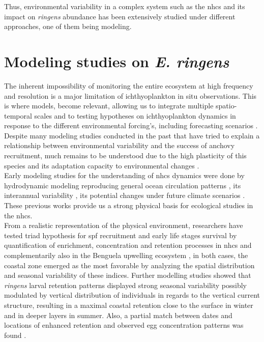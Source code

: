 Thus, environmental variability in a complex system such as the \acrshort{nhcs} and its impact on \textit{\gls{ringens}} abundance has been extensively studied under different approaches, one of them being modeling.\\

\clearpage
\section{Modeling studies on \textit{E. ringens}}\label{Chap1ModeAnch}

The inherent impossibility of monitoring the entire ecosystem at high frequency and resolution is a major limitation of ichthyoplankton in situ observations. This is where models, become relevant, allowing us to integrate multiple spatio-temporal scales and to testing hypotheses on ichthyoplankton dynamics in response to the different  environmental forcing’s, including forecasting scenarios \citep{GearDode2020}.\\

Despite many modeling studies conducted in the past \citep{LettPenv2007,BrocLett2008,GutiRami2008,OlivPena2011,XuChai2013} that have tried to explain a relationship between environmental variability and the success of anchovy recruitment, much remains to be understood due to the high plasticity of this species and its adaptation capacity to environmental changes \citep{EspiBert2008,EspiBert2014,CanaAdas2018,PlazCern2018}.\\

Early modeling studies for the understanding of \acrshort{nhcs} dynamics were done by hydrodynamic modeling reproducing general ocean circulation patterns \citep{PenvEche2005,ColaMcwi2012}, its interannual variability \citep{ColaCape2008,EspiEche2017}, its potential changes under future climate scenarios \citep{OerdCola2015,EcheGeva2020}. These previous works provide us a strong physical basis for ecological studies in the \acrshort{nhcs}.\\

From a realistic representation of the physical environment, researchers have tested \cite{Baku1998} triad hypothesis for \acrshort{spf} recruitment and early life stages survival by quantification of enrichment, concentration and retention processes in \acrshort{nhcs} \citep{LettPenv2007} and complementarily also in the Benguela upwelling ecosystem \citep{LettRoy2006}, in both cases, the coastal zone emerged as the most favorable by analyzing the spatial distribution and seasonal variability of these indices. Further modelling studies showed that \textit{\gls{ringens}} larval retention patterns displayed strong seasonal variability possibly modulated by vertical distribution of individuals in regards to the vertical current structure, resulting in a maximal coastal retention close to the surface in winter and in deeper layers in summer. Also, a partial match between dates and locations of enhanced retention and observed egg concentration patterns was found \citep{BrocLett2008}.\\

